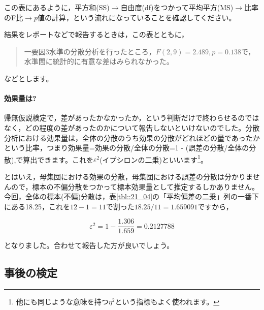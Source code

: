 \documentclass{ltjbook}
\begin{document}
この表にあるように，平方和(SS)$\to$自由度(df)をつかって平均平方(MS)$\to$比率のF比$\to$$p$値の計算，という流れになっていることを確認してください。

			結果をレポートなどで報告するときは，この表とともに，
			\begin{quote}
				一要因3水準の分散分析を行ったところ，$F(2,9)=2.489,p=0.138$で，水準間に統計的に有意な差はみられなかった。
			\end{quote}
			などとします。

			\paragraph{効果量は?}
			帰無仮説検定で，差があったかなかったか，という判断だけで終わらせるのではなく，どの程度の差があったのかについて報告しないといけないのでした。分散分析における効果量は，全体の分散のうち効果の分散がどれほどの量であったかという比率，つまり効果量=効果の分散/全体の分散=1 - (誤差の分散/全体の分散),で算出できます。これを$\varepsilon^2$(イプシロンの二乗)といいます\footnote{他にも同じような意味を持つ$\eta^2$という指標もよく使われます。}。

			とはいえ，母集団における効果の分散，母集団における誤差の分散は分かりませんので，標本の不偏分散をつかって標本効果量として推定するしかありません。今回，全体の標本(不偏)分散は，表\ref{tbl::21_04}の「平均偏差の二乗」列の一番下にある18.25，これを$12-1=11$で割った$18.25/11=1.659091$ですから，

			\[\varepsilon^2 = 1 - \frac{1.306}{1.659} = 0.2127788 \]

			となりました。合わせて報告した方が良いでしょう。

			\subsection{事後の検定}
\end{document}
